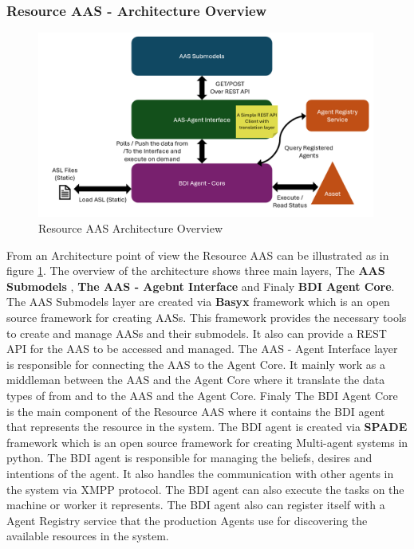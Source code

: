 \newpage
\subsubsection{Resource AAS - Architecture Overview }

\begin{figure}[h]
    \centering
    \includegraphics[width=0.99\textwidth]{Images/Resource_Agent_Arch_overview.png}
    \caption{Resource AAS Architecture Overview}
    \label{fig:resource_aas_architecture_overview}
\end{figure}
From an Architecture point of view the Resource AAS can be illustrated as in figure \ref{fig:resource_aas_architecture_overview}.
The overview of the architecture shows three main layers, The \textbf{AAS Submodels} , \textbf{The AAS - Agebnt Interface} and Finaly \textbf{BDI Agent Core}.
The AAS Submodels layer are created via \textbf{Basyx} framework which is an open source framework for creating AASs.
This framework provides the necessary tools to create and manage AASs and their submodels.
It also can provide a REST API for the AAS to be accessed and managed.
The AAS - Agent Interface layer is responsible for connecting the AAS to the Agent Core.
It mainly work as a middleman between the AAS and the Agent Core where it translate the data types of from and to the AAS and the Agent Core.
Finaly The BDI Agent Core is the main component of the Resource AAS where it contains the BDI agent that represents the resource in the system.
The BDI agent is created via \textbf{SPADE} framework which is an open source framework for creating Multi-agent systems in python.
The BDI agent is responsible for managing the beliefs, desires and intentions of the agent.
It also handles the communication with other agents in the system via XMPP protocol.
The BDI agent can also execute the tasks on the machine or worker it represents.
The BDI agent also can register itself with a Agent Registry service that the production Agents
use for discovering the available resources in the system.

